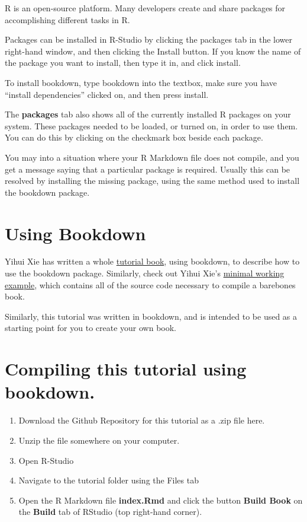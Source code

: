 \documentclass[]{book}
\providecommand{\tightlist}{%
  \setlength{\itemsep}{0pt}\setlength{\parskip}{0pt}}
\theoremstyle{definition}
\theoremstyle{definition}
\theoremstyle{definition}
\theoremstyle{remark}
\begin{document}
R is an open-source platform. Many developers create and share packages
for accomplishing different tasks in R.

Packages can be installed in R-Studio by clicking the packages tab in
the lower right-hand window, and then clicking the Install button. If
you know the name of the package you want to install, then type it in,
and click install.

To install bookdown, type bookdown into the textbox, make sure you have
``install dependencies'' clicked on, and then press install.

The \textbf{packages} tab also shows all of the currently installed R
packages on your system. These packages needed to be loaded, or turned
on, in order to use them. You can do this by clicking on the checkmark
box beside each package.

You may into a situation where your R Markdown file does not compile,
and you get a message saying that a particular package is required.
Usually this can be resolved by installing the missing package, using
the same method used to install the bookdown package.

\section{Using Bookdown}\label{using-bookdown}

Yihui Xie has written a whole
\href{https://bookdown.org/yihui/bookdown/}{tutorial book}, using
bookdown, to describe how to use the bookdown package. Similarly, check
out Yihui Xie's
\href{https://bookdown.org/yihui/bookdown/get-started.html}{minimal
working example}, which contains all of the source code necessary to
compile a barebones book.

Similarly, this tutorial was written in bookdown, and is intended to be
used as a starting point for you to create your own book.

\section{Compiling this tutorial using
bookdown.}\label{compiling-this-tutorial-using-bookdown.}

\begin{enumerate}
\def\labelenumi{\arabic{enumi}.}
\tightlist
\item
  Download the Github Repository for this tutorial as a .zip file here.
\item
  Unzip the file somewhere on your computer.
\item
  Open R-Studio
\item
  Navigate to the tutorial folder using the Files tab
\item
  Open the R Markdown file \textbf{index.Rmd} and click the button
  \textbf{Build Book} on the \textbf{Build} tab of RStudio (top
  right-hand corner).
\end{enumerate}
\end{document}
